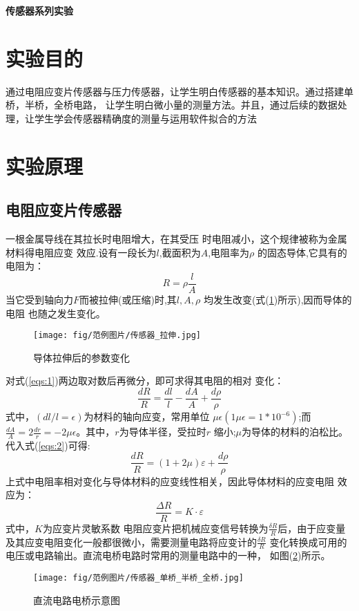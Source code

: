 \documentclass[a4paper,UTF8]{ctexart}
\begin{document}
\begin{center}
    \textbf{\Huge 传感器系列实验}
\end{center}

\section{实验目的}
    通过电阻应变片传感器与压力传感器，让学生明白传感器的基本知识。通过搭建单桥，半桥，全桥电路，
让学生明白微小量的测量方法。并且，通过后续的数据处理，让学生学会传感器精确度的测量与运用软件拟合的方法

\section{实验原理}
    \subsection*{电阻应变片传感器}
    一根金属导线在其拉长时电阻增大，在其受压
时电阻减小，这个规律被称为金属材料得电阻应变
效应.设有一段长为$l$,截面积为$A$,电阻率为$\rho$
的固态导体,它具有的电阻为：
\begin{equation}
    R = \rho \frac{l}{A} \label{eqs:1}    
\end{equation}
当它受到轴向力$F$而被拉伸(或压缩)时,其$l,A,\rho$
均发生改变(式(\ref*{fig:1})所示),因而导体的电阻
也随之发生变化。
\begin{figure}[!hp]
    \centering
    \texttt{[image: fig/范例图片/传感器\_拉伸.jpg]}
    \caption{导体拉伸后的参数变化}
    \label{fig:1}
\end{figure}

对式(\ref*{eqs:1})两边取对数后再微分，即可求得其电阻的相对
变化：
\begin{equation}
    \frac{dR}{R}=\frac{dl}{l}-\frac{dA}{A}+\frac{d\rho}{\rho}
    \label{eqs:2}
\end{equation}
式中，$(dl/l=\epsilon)$为材料的轴向应变，常用单位
$\mu\epsilon(1\mu\epsilon=1*10^{-6})$;而$\frac{dA}{A}
=2\frac{dr}{r}=-2\mu\epsilon$。其中，$r$为导体半径，受拉时$r$
缩小;$\mu$为导体的材料的泊松比。代入式(\ref*{eqs:2})可得:
\begin{equation}
    \frac{dR}{R}=(1+2\mu)\varepsilon+\frac{d\rho}{\rho}
    \label{eqs:3}
\end{equation}
上式中电阻率相对变化与导体材料的应变线性相关，因此导体材料的应变电阻
效应为：
\begin{equation}
    \frac{\Delta R}{R}=K\cdot\varepsilon
    \label{eqs:4}
\end{equation}
式中，$K$为应变片灵敏系数
\newpage
    电阻应变片把机械应变信号转换为$\frac{\delta R}{R}$后，由于应变量
及其应变电阻变化一般都很微小，需要测量电路将应变计的$\frac{\delta R}{R}$
变化转换成可用的电压或电路输出。直流电桥电路时常用的测量电路中的一种，
如图(\ref*{fig:2})所示。
\begin{figure}[!hp]
    \centering
    \texttt{[image: fig/范例图片/传感器\_单桥\_半桥\_全桥.jpg]}
    \caption{直流电路电桥示意图}
    \label{fig:2}
\end{figure}
\end{document}
